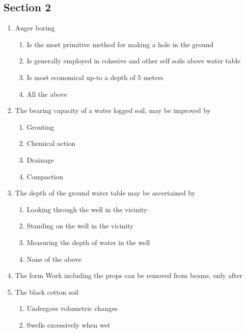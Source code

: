 \documentclass[11pt,a4paper]{article}
\begin{document}
\subsection*{Section 2}
\begin{enumerate}
\item{Auger boring}
\begin{enumerate}[label=\Alph*.]
\item{Is the most primitive method for making a hole in the ground}
\item{Is generally employed in cohesive and other self soils above water table}
\item{Is most economical up-to a depth of 5 meters}
\item{All the above}
\end{enumerate}
\item{The bearing capacity of a water logged soil, may be improved by}
\begin{enumerate}[label=\Alph*.]
\item{Grouting}
\item{Chemical action}
\item{Drainage}
\item{Compaction}
\end{enumerate}
\item{The depth of the ground water table may be ascertained by}
\begin{enumerate}[label=\Alph*.]
\item{Looking through the well in the vicinity}
\item{Standing on the well in the vicinity}
\item{Measuring the depth of water in the well}
\item{None of the above}
\end{enumerate}
\item{The form Work including the props can be removed from beams, only after}
\\
\item{The black cotton soil}
\begin{enumerate}[label=\Alph*.]
\item{Undergoes volumetric changes}
\item{Swells excessively when wet}

\end{enumerate}
\end{enumerate}
\end{document}
